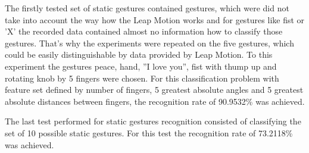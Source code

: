 The firstly tested set of static gestures contained gestures, which were did not take into account the way how the Leap Motion works and for gestures like fist or 'X' the recorded data contained almost no information how to classify those gestures.
That's why the experiments were repeated on the five gestures, which could be easily distinguishable by data provided by Leap Motion. To this experiment the gestures peace, hand, ''I love you'', fist with thump up and rotating knob by 5 fingers were chosen.
For this classification problem with feature set defined by number of fingers, 5 greatest absolute angles and 5 greatest absolute distances between fingers, the recognition rate of 90.9532\% was achieved. 

The last test performed for static gestures recognition consisted of classifying the set of 10 possible static gestures. For this test the recognition rate of 73.2118\% was achieved.

